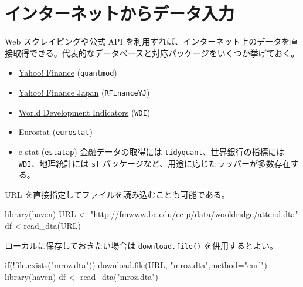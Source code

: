 \documentclass[
  letterpaper,
  xelatex,
  ja=standard, xelatex]{bxjsbook}
\newenvironment{Shaded}{\begin{snugshade}}{\end{snugshade}}
\newcommand{\AttributeTok}[1]{\textcolor[rgb]{0.40,0.45,0.13}{#1}}
\newcommand{\ControlFlowTok}[1]{\textcolor[rgb]{0.00,0.23,0.31}{#1}}
\newcommand{\FunctionTok}[1]{\textcolor[rgb]{0.28,0.35,0.67}{#1}}
\newcommand{\NormalTok}[1]{\textcolor[rgb]{0.00,0.23,0.31}{#1}}
\newcommand{\OtherTok}[1]{\textcolor[rgb]{0.00,0.23,0.31}{#1}}
\newcommand{\SpecialCharTok}[1]{\textcolor[rgb]{0.37,0.37,0.37}{#1}}
\newcommand{\StringTok}[1]{\textcolor[rgb]{0.13,0.47,0.30}{#1}}
\providecommand{\tightlist}{%
  \setlength{\itemsep}{0pt}\setlength{\parskip}{0pt}}\usepackage{longtable,booktabs,array}
\begin{document}
\section{インターネットからデータ入力}\label{ux30a4ux30f3ux30bfux30fcux30cdux30c3ux30c8ux304bux3089ux30c7ux30fcux30bfux5165ux529b}

Web スクレイピングや公式 API
を利用すれば、インターネット上のデータを直接取得できる。代表的なデータベースと対応パッケージをいくつか挙げておく。

\begin{itemize}
\tightlist
\item
  \href{https://finance.yahoo.com/}{Yahoo! Finance} (\texttt{quantmod})
\item
  \href{https://finance.yahoo.co.jp/}{Yahoo! Finance Japan}
  (\texttt{RFinanceYJ})
\item
  \href{http://www.worldbank.org/}{World Development Indicators}
  (\texttt{WDI})
\item
  \href{http://ec.europa.eu/eurostat/data/database}{Eurostat}
  (\texttt{eurostat})
\item
  \href{https://www.e-stat.go.jp/}{e-stat} (\texttt{estatap})
  金融データの取得には \texttt{tidyquant}、世界銀行の指標には
  \texttt{WDI}、地理統計には \texttt{sf}
  パッケージなど、用途に応じたラッパーが多数存在する。
\end{itemize}

URL を直接指定してファイルを読み込むことも可能である。

\begin{Shaded}
\begin{Highlighting}[]
\FunctionTok{library}\NormalTok{(haven)}
\NormalTok{URL }\OtherTok{\textless{}{-}} \StringTok{"http://fmwww.bc.edu/ec{-}p/data/wooldridge/attend.dta"}
\NormalTok{df }\OtherTok{\textless{}{-}}\FunctionTok{read\_dta}\NormalTok{(URL)}
\end{Highlighting}
\end{Shaded}

ローカルに保存しておきたい場合は \texttt{download.file()}
を併用するとよい。

\begin{Shaded}
\begin{Highlighting}[]
\ControlFlowTok{if}\NormalTok{(}\SpecialCharTok{!}\FunctionTok{file.exists}\NormalTok{(}\StringTok{"mroz.dta"}\NormalTok{)) }\FunctionTok{download.file}\NormalTok{(URL, }\StringTok{"mroz.dta"}\NormalTok{,}\AttributeTok{method=}\StringTok{"curl"}\NormalTok{)}
\FunctionTok{library}\NormalTok{(haven)}
\NormalTok{df }\OtherTok{\textless{}{-}} \FunctionTok{read\_dta}\NormalTok{(}\StringTok{"mroz.dta"}\NormalTok{)}
\end{Highlighting}
\end{Shaded}
\end{document}
